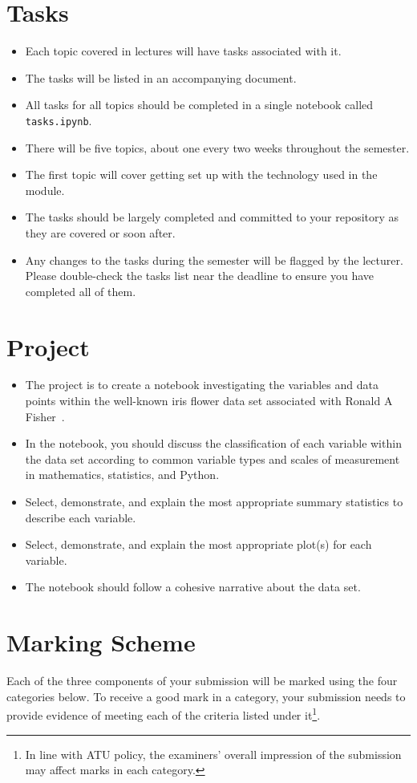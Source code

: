 \documentclass{iansnotes}
\begin{document}
\section{Tasks}

\begin{itemize}
  \item Each topic covered in lectures will have tasks associated with it.
  \item The tasks will be listed in an accompanying document.
  \item All tasks for all topics should be completed in a single notebook called \texttt{tasks.ipynb}.
  \item There will be five topics, about one every two weeks throughout the semester.
  \item The first topic will cover getting set up with the technology used in the module.
  \item The tasks should be largely completed and committed to your repository as they are covered or soon after.
  \item Any changes to the tasks during the semester will be flagged by the lecturer. Please double-check the tasks list near the deadline to ensure you have completed all of them.
\end{itemize} 


\section{Project}

\begin{itemize}
  \item The project is to create a notebook investigating the variables and data points within the well-known iris flower data set associated with Ronald A Fisher~\autocite{irisdataset}. 
  \item In the notebook, you should discuss the classification of each variable within the data set according to common variable types and scales of measurement in mathematics, statistics, and Python.
  \item Select, demonstrate, and explain the most appropriate summary statistics to describe each variable.
  \item Select, demonstrate, and explain the most appropriate plot(s) for each variable.
  \item The notebook should follow a cohesive narrative about the data set.
\end{itemize} 


\section{Marking Scheme}
Each of the three components of your submission will be marked using the four categories below.
To receive a good mark in a category, your submission needs to provide evidence of meeting each of the criteria listed under it\footnote{In line with ATU policy, the examiners' overall impression of the submission may affect marks in each category.}.
\end{document}
